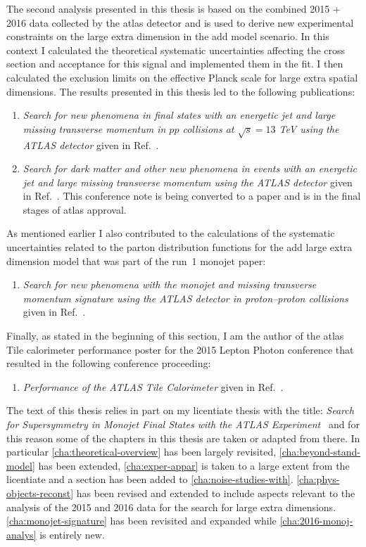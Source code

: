 The second analysis presented in this thesis is based on the combined 2015 +
2016 data collected by the \gls{atlas} detector and is used to derive new
experimental constraints on the large extra dimension in the \gls{add} model
scenario. In this context I calculated the theoretical systematic uncertainties
affecting the cross section and acceptance for this signal and implemented them
in the fit. I then calculated the exclusion limits on the effective Planck scale
for large extra spatial dimensions. The results presented in this thesis led to
the following publications:
\begin{enumerate}[A -]
\item \emph{{Search for new phenomena in final states with an energetic jet and
      large missing transverse momentum in $pp$ collisions at $\sqrt{s} = 13$
      TeV using the ATLAS detector}} given in Ref.~\cite{MonoJetPaper}.
\item \emph{{Search for dark matter and other new phenomena in events with an
      energetic jet and large missing transverse momentum using the ATLAS
      detector}} given in Ref.~\cite{MonoJetPaper2016}. This conference note is
  being converted to a paper and is in the final stages of \gls{atlas} approval.
\end{enumerate}
As mentioned earlier I also contributed to the calculations of the systematic
uncertainties related to the parton distribution functions for the \gls{add}
large extra dimension model that was part of the run~1 monojet paper:
\begin{enumerate}[C -]
\item \emph{Search for new phenomena with the monojet and missing transverse
    momentum signature using the ATLAS detector in proton–proton
    collisions} given in Ref.~\cite{RunIPaper}.
\end{enumerate}
Finally, as stated in the beginning of this section, I am the author of the
\gls{atlas} Tile calorimeter performance poster for the 2015 Lepton Photon
conference that resulted in the following conference proceeding:
\begin{enumerate}[D -]
\item \emph{{Performance of the ATLAS Tile Calorimeter}} given in
  Ref.~\cite{TileCalPerformanceBertoli}.
\end{enumerate}

The text of this thesis relies in part on my licentiate thesis with the title:
\emph{Search for Supersymmetry in Monojet Final States with the ATLAS
  Experiment}~\cite{MyLicentiate} and for this reason some of the chapters in
this thesis are taken or adapted from there. In particular
\cref{cha:theoretical-overview} has been largely revisited,
\cref{cha:beyond-stand-model} has been extended, \cref{cha:exper-appar} is taken
to a large extent from the licentiate and a section has been added to
\cref{cha:noise-studies-with}. \cref{cha:phys-objects-reconst} has been revised
and extended to include aspects relevant to the analysis of the 2015 and 2016
data for the search for large extra dimensions. \cref{cha:monojet-signature} has
been revisited and expanded while \cref{cha:2016-monoj-analys} is entirely new.
